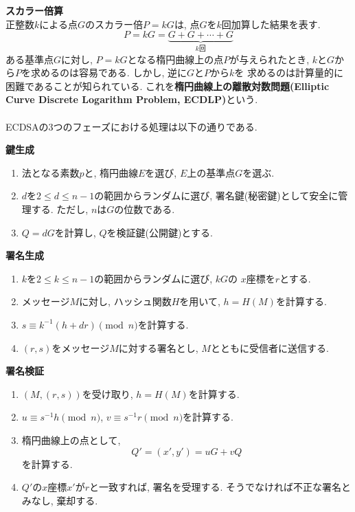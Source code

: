 \vspace{0.5em}
\noindent\textbf{スカラー倍算}\\
\indent 正整数$k$による点$G$のスカラー倍$P=kG$は, 点$G$を$k$回加算した結果を表す.
\[
  P=kG=\underbrace{G+G+\cdots+G}_{k\text{回}}
\]
\indent ある基準点$G$に対し, $P = kG$となる楕円曲線上の点$P$が与えられたとき, 
$k$と$G$から$P$を求めるのは容易である. しかし, 逆に$G$と$P$から$k$を
求めるのは計算量的に困難であることが知られている. 
これを\textbf{楕円曲線上の離散対数問題(Elliptic Curve Discrete Logarithm Problem, ECDLP)}という.\\[1em]

\\
\indent ECDSAの3つのフェーズにおける処理は以下の通りである.
\vspace{1em}
\let\ltxlist\list
\begin{breakitembox}[l]{\textbf{鍵生成}}
  　
  \begin{enumerate}[parsep=7pt]
    \item 法となる素数$p$と, 楕円曲線$E$を選び, $E$上の基準点$G$を選ぶ.
    \item $d$を$2\leq d\leq n-1$の範囲からランダムに選び, 
    署名鍵(秘密鍵)として安全に管理する. ただし, $n$は$G$の位数である.
    \item $Q=dG$を計算し, $Q$を検証鍵(公開鍵)とする.
  \end{enumerate}
\end{breakitembox}
\vspace{1em}
\let\ltxlist\list
\begin{breakitembox}[l]{\textbf{署名生成}}
  　
  \begin{enumerate}[parsep=7pt]
    \item $k$を$2\leq k\leq n-1$の範囲からランダムに選び, $kG$の
    $x$座標を$r$とする.
    \item メッセージ$M$に対し, ハッシュ関数$H$を用いて, $h=H(M)$を計算する.
    \item $s\equiv k^{-1}(h+dr)\pmod n$を計算する.
    \item $(r,s)$をメッセージ$M$に対する署名とし, 
    $M$とともに受信者に送信する.
  \end{enumerate}
\end{breakitembox}
\vspace{1em}
\let\ltxlist\list
\begin{breakitembox}[l]{\textbf{署名検証}}
  　
  \begin{enumerate}[parsep=7pt]
    \item $(M,(r,s))$を受け取り, $h=H(M)$を計算する. 
    \item $u\equiv s^{-1}h\pmod n$, $v\equiv s^{-1}r\pmod n$を計算する.
    \item 楕円曲線上の点として, 
    \[
      Q'=(x',y')=uG+vQ
    \]
    を計算する.
    \item $Q'$の$x$座標$x'$が$r$と一致すれば, 署名を受理する.
    そうでなければ不正な署名とみなし, 棄却する.
  \end{enumerate}
\end{breakitembox}
